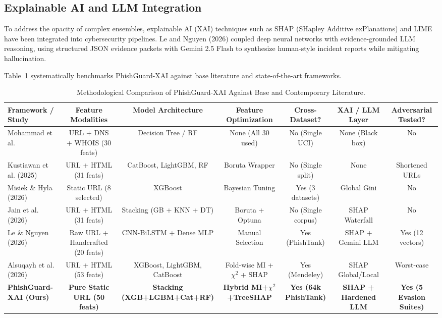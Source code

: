 \documentclass[journal]{IEEEtran}
\begin{document}
\subsection{Explainable AI and LLM Integration}
To address the opacity of complex ensembles, explainable AI (XAI) techniques such as SHAP (SHapley Additive exPlanations) and LIME have been integrated into cybersecurity pipelines. Le and Nguyen (2026) \cite{lenguyen2026} coupled deep neural networks with evidence-grounded LLM reasoning, using structured JSON evidence packets with Gemini 2.5 Flash to synthesize human-style incident reports while mitigating hallucination.

Table~\ref{tab:literature_comparison} systematically benchmarks PhishGuard-XAI against base literature and state-of-the-art frameworks.

\begin{table}[t]
\centering
\caption{Methodological Comparison of PhishGuard-XAI Against Base and Contemporary Literature.}
\label{tab:literature_comparison}
\begin{tabular}{lcccccc}
\toprule
\textbf{Framework / Study} & \textbf{Feature Modalities} & \textbf{Model Architecture} & \textbf{Feature Optimization} & \textbf{Cross-Dataset?} & \textbf{XAI / LLM Layer} & \textbf{Adversarial Tested?} \\
\midrule
Mohammad et al. \cite{mohammad2014} & URL + DNS + WHOIS (30 feats) & Decision Tree / RF & None (All 30 used) & No (Single UCI) & None (Black box) & No \\
Kustiawan et al. (2025) \cite{kustiawan2025} & URL + HTML (31 feats) & CatBoost, LightGBM, RF & Boruta Wrapper & No (Single split) & None & Shortened URLs \\
Misiek \& Hyla (2026) \cite{misiek2026} & Static URL (8 selected) & XGBoost & Bayesian Tuning & Yes (3 datasets) & Global Gini & No \\
Jain et al. (2026) \cite{jain2026} & URL + HTML (31 feats) & Stacking (GB + KNN + DT) & Boruta + Optuna & No (Single corpus) & SHAP Waterfall & No \\
Le \& Nguyen (2026) \cite{lenguyen2026} & Raw URL + Handcrafted (20 feats) & CNN-BiLSTM + Dense MLP & Manual Selection & Yes (PhishTank) & SHAP + Gemini LLM & Yes (12 vectors) \\
Alsuqayh et al. (2026) \cite{alsuqayh2026} & URL + HTML (53 feats) & XGBoost, LightGBM, CatBoost & Fold-wise MI + $\chi^2$ + SHAP & Yes (Mendeley) & SHAP Global/Local & Worst-case \\
\textbf{PhishGuard-XAI (Ours)} & \textbf{Pure Static URL (50 feats)} & \textbf{Stacking (XGB+LGBM+Cat+RF)} & \textbf{Hybrid MI+$\chi^2$+TreeSHAP} & \textbf{Yes (64k PhishTank)} & \textbf{SHAP + Hardened LLM} & \textbf{Yes (5 Evasion Suites)} \\
\bottomrule
\end{tabular}
\end{table}
\end{document}
